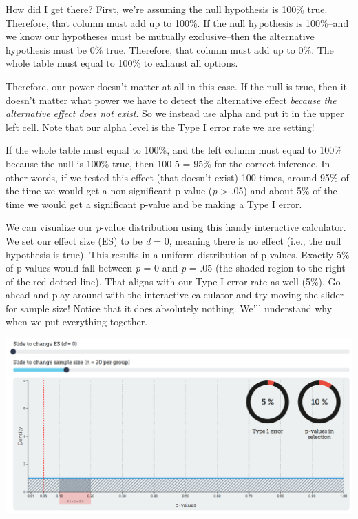 \documentclass[
]{book}
\begin{document}
How did I get there? First, we're assuming the null hypothesis is 100\% true. Therefore, that column must add up to 100\%. If the null hypothesis is 100\%--and we know our hypotheses must be mutually exclusive--then the alternative hypothesis must be 0\% true. Therefore, that column must add up to 0\%. The whole table must equal to 100\% to exhaust all options.

Therefore, our power doesn't matter at all in this case. If the null is true, then it doesn't matter what power we have to detect the alternative effect \emph{because the alternative effect does not exist}. So we instead use alpha and put it in the upper left cell. Note that our alpha level is the Type I error rate we are setting!

If the whole table must equal to 100\%, and the left column must equal to 100\% because the null is 100\% true, then 100-5 = 95\% for the correct inference. In other words, if we tested this effect (that doesn't exist) 100 times, around 95\% of the time we would get a non-significant p-value (\emph{p} \textgreater{} .05) and about 5\% of the time we would get a significant p-value and be making a Type I error.

We can visualize our \emph{p}-value distribution using this \href{https://rpsychologist.com/d3/pdist/}{handy interactive calculator}. We set our effect size (ES) to be \emph{d} = 0, meaning there is no effect (i.e., the null hypothesis is true). This results in a uniform distribution of p-values. Exactly 5\% of p-values would fall between \emph{p} = 0 and \emph{p} = .05 (the shaded region to the right of the red dotted line). That aligns with our Type I error rate as well (5\%). Go ahead and play around with the interactive calculator and try moving the slider for sample size! Notice that it does absolutely nothing. We'll understand why when we put everything together.

\includegraphics{images/05-bean/null.png}
\end{document}

